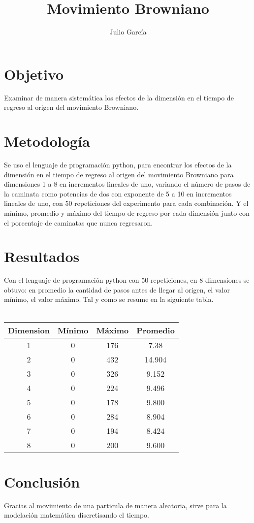 \documentclass{article}
\title { Movimiento Browniano}
\author{Julio Garc\'ia}
\begin{document}
\maketitle

\section{Objetivo}
Examinar de manera sistemática los efectos de la dimensión en el tiempo de regreso al origen del movimiento Browniano.

\section{Metodolog\'ia}
Se uso el  lenguaje de programación python, para encontrar	los efectos de la dimensión en el tiempo de regreso al origen del movimiento Browniano para dimensiones 1 a 8 en incrementos lineales de uno, variando el número de pasos de la caminata como potencias de dos con exponente de 5 a 10 en incrementos lineales de uno, con 50 repeticiones del experimento para cada combinación. Y el mínimo, promedio y máximo del tiempo de regreso por cada dimensión junto con el porcentaje de caminatas que nunca regresaron. \citet{p1}

\newpage
\section{Resultados}
Con el lenguaje de programación  python con 50 repeticiones, en 8 dimensiones se obtuvo: 
 en promedio la cantidad de pasos antes de llegar al origen, el valor mínimo, el valor  máximo. Tal y como se resume en la siguiente tabla. \\ \\


\begin{tabular}{|c|c|c|c|}
	\hline
	Dimension & Mínimo & Máximo & Promedio \\
	\hline
	1 & 0 & 176 & 7.38 \\
	\hline
	2 & 0 & 432 & 14.904 \\
	\hline
	3 & 0 & 326 & 9.152 \\
	\hline
	4 & 0 & 224 & 9.496 \\
	\hline
	5 & 0 & 178 & 9.800 \\
	\hline
	6 & 0 & 284 & 8.904 \\
	\hline
	7 & 0 & 194 & 8.424 \\
	\hline
	8 & 0 & 200 & 9.600 \\
	\hline
\end{tabular}



\section{Conclusi\'on}
Gracias al movimiento de una particula de manera aleatoria, sirve para la modelación matemática discretisando el tiempo.



\end{document}
